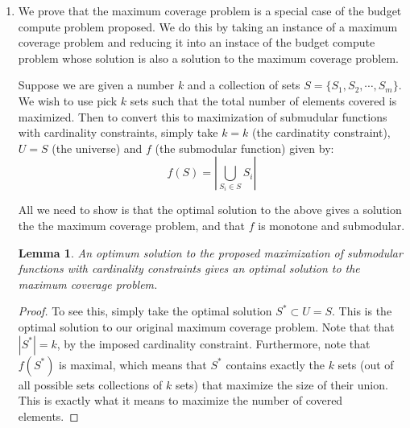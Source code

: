 \documentclass[12pt]{exam}
\newtheorem{lemma}[theorem]{Lemma}
\newcommand{\Q}[1]{\question{\large{\textbf{#1}}}}
\begin{document}
\begin{questions}
\newpage
\Q{Problem 20}
\begin{solution}
  \begin{enumerate}[label=(\alph*)]
    \item
      We prove that the maximum coverage problem is a special case of the budget compute problem proposed. We do this by taking an instance of a maximum coverage problem and reducing it into an instace of the budget compute problem whose solution is also a solution to the maximum coverage problem.

      Suppose we are given a number $k$ and a collection of sets $S = \{ S_1, S_2, \cdots, S_m\}$. We wish to use pick $k$ sets such that the total number of elements covered is maximized. Then to convert this to maximization of submudular functions with cardinality constraints, simply take $k = k$ (the cardinatity constraint), $U = S$ (the universe) and $f$ (the submodular function) given by:
      \[
        f(S) = \left|\bigcup_{S_i \in S} S_i\right|
      \]

      All we need to show is that the optimal solution to the above gives a solution the the maximum coverage problem, and that $f$ is monotone and submodular. 
      \begin{lemma}
        An optimum solution to the proposed maximization of submodular functions with cardinality constraints gives an optimal solution to the maximum coverage problem.
      \end{lemma}
      \begin{proof}
        To see this, simply take the optimal solution $S^* \subset U = S$. This is the optimal solution to our original maximum coverage problem. Note that that $|S^*| = k$, by the imposed cardinality constraint. Furthermore, note that $f(S^*)$ is maximal, which means that $S^*$ contains exactly the $k$ sets (out of all possible sets collections of $k$ sets) that maximize the size of their union. This is exactly what it means to maximize the number of covered elements.
      \end{proof}


\end{enumerate}
\end{solution}
\end{questions}
\end{document}
